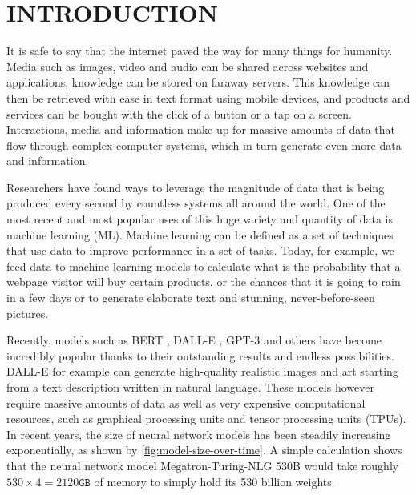 
\chapter{INTRODUCTION}\label{chapter:introduction}

It is safe to say that the internet paved the way for many things for humanity.
Media such as images, video and audio can be shared across websites and applications, knowledge can be stored on faraway servers.
This knowledge can then be retrieved with ease in text format using mobile devices, and products and services can be bought with the click of a button or a tap on a screen.
Interactions, media and information make up for massive amounts of data that flow through complex computer systems, which in turn generate even more data and information.

Researchers have found ways to leverage the magnitude of data that is being produced every second by countless systems all around the world.
One of the most recent and most popular uses of this huge variety and quantity of data is machine learning (ML).
Machine learning can be defined as a set of techniques that use data to improve performance in a set of tasks.
Today, for example, we feed data to machine learning models to calculate what is the probability that a webpage visitor will buy certain products, or the chances that it is going to rain in a few days or to generate elaborate text and stunning, never-before-seen pictures.

Recently, models such as BERT \cite{devlin2018bert}, DALL-E \cite{ramesh2021zero}, GPT-3 \cite{brown2020gpt3} and others have become incredibly popular thanks to their outstanding results and endless possibilities.
DALL-E for example can generate high-quality realistic images and art starting from a text description written in natural language.
These models however require massive amounts of data as well as very expensive computational resources, such as graphical processing units and tensor processing units (TPUs).
In recent years, the size of neural network models has been steadily increasing exponentially, as shown by \autoref{fig:model-size-over-time}.
A simple calculation shows that the neural network model Megatron-Turing-NLG 530B \cite{smith2022megatronturingnlg} would take roughly $530 \times 4 = 2120\texttt{GB}$ of memory to simply hold its 530 billion weights.

